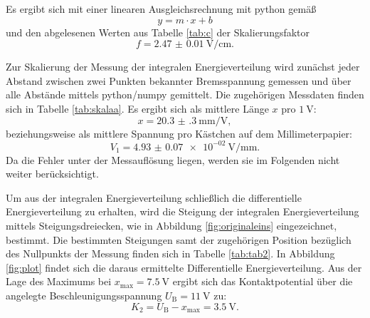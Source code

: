 Es ergibt sich mit einer linearen Ausgleichsrechnung mit python \cite{python} gemäß
\begin{equation*}
	y = m \cdot x + b
\end{equation*}
und den abgelesenen Werten aus Tabelle \ref{tab:c} der Skalierungsfaktor
\begin{equation*}
	f = \SI{2.47(1)}{\volt\per\centi\meter} \mathrm{.}
\end{equation*}

Zur Skalierung der Messung der integralen Energieverteilung wird zunächst jeder Abstand zwischen zwei Punkten bekannter Bremsspannung gemessen und über alle Abstände mittels python/numpy \cite{numpy} gemittelt.
Die zugehörigen Messdaten finden sich in Tabelle \ref{tab:skalaa}.
Es ergibt sich als mittlere Länge $x$ pro $\SI{1}{\volt}$:
\begin{equation}
	x=\SI{20.3(3)}{\milli\meter\per\volt} \mathrm{,}
\end{equation}
beziehungsweise als mittlere Spannung pro Kästchen auf dem Millimeterpapier:
\begin{equation}
	V_1= \SI{4.93(7)e-02}{\volt\per\milli\meter} \mathrm{.}
\end{equation}
Da die Fehler unter der Messauflösung liegen, werden sie im Folgenden nicht weiter berücksichtigt.

Um aus der integralen Energieverteilung schließlich die differentielle Energieverteilung zu erhalten, wird die Steigung der integralen Energieverteilung mittels Steigungsdreiecken, wie in Abbildung \ref{fig:originaleins} eingezeichnet, bestimmt.
Die bestimmten Steigungen samt der zugehörigen Position bezüglich des Nullpunkts der Messung finden sich in Tabelle \ref{tab:tab2}.
In Abbildung \ref{fig:plot} findet sich die daraus ermittelte Differentielle Energieverteilung. Aus der Lage des Maximums bei $x_{\mathrm{max}}=\SI{7.5}{\volt}$ ergibt sich das Kontaktpotential über die angelegte Beschleunigungsspannung $U_\mathrm{B}=\SI{11}{\volt}$ zu:
\begin{equation}
	K_2=U_\mathrm{B}-x_\mathrm{max}=\SI{3.5}{\volt} \text{.}
\end{equation}

